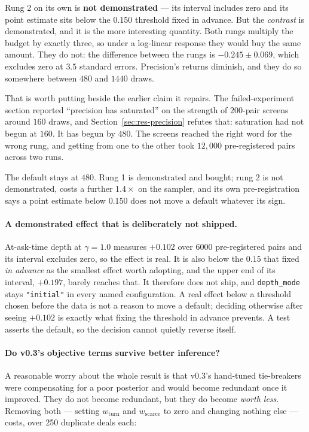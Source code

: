 \documentclass[11pt,a4paper]{article}
\begin{document}
Rung 2 on its own is \textbf{not demonstrated} --- its interval includes zero
and its point estimate sits below the $0.150$ threshold fixed in advance. But
the \emph{contrast} is demonstrated, and it is the more interesting quantity.
Both rungs multiply the budget by exactly three, so under a log-linear response
they would buy the same amount. They do not: the difference between the rungs
is $-0.245 \pm 0.069$, which excludes zero at $3.5$ standard errors.
Precision's returns diminish, and they do so somewhere between $480$ and $1440$
draws.

That is worth putting beside the earlier claim it repairs. The failed-experiment
section reported ``precision has saturated'' on the strength of $200$-pair
screens around $160$ draws, and Section~\ref{sec:res-precision} refutes that:
saturation had not begun at $160$. It has begun by $480$. The screens reached
the right word for the wrong rung, and getting from one to the other took
$12{,}000$ pre-registered pairs across two runs.

The default stays at $480$. Rung 1 is demonstrated and bought; rung 2 is not
demonstrated, costs a further $1.4\times$ on the sampler, and its own
pre-registration says a point estimate below $0.150$ does not move a default
whatever its sign.

\paragraph{A demonstrated effect that is deliberately not shipped.} At-ask-time
depth at $\gamma = 1.0$ measures $+0.102$ over $6000$ pre-registered pairs and
its interval excludes zero, so the effect is real. It is also below the $0.15$
that  fixed \emph{in advance} as the
smallest effect worth adopting, and the upper end of its interval, $+0.197$,
barely reaches that. It therefore does not ship, and \texttt{depth\_mode} stays
\texttt{"initial"} in every named configuration. A real effect below a threshold
chosen before the data is not a reason to move a default; deciding otherwise
after seeing $+0.102$ is exactly what fixing the threshold in advance prevents.
A test asserts the default, so the decision cannot quietly reverse itself.

\paragraph{Do v0.3's objective terms survive better inference?} A reasonable
worry about the whole result is that v0.3's hand-tuned tie-breakers were
compensating for a poor posterior and would become redundant once it improved.
They do not become redundant, but they do become \emph{worth less}. Removing
both --- setting $w_{\mathrm{turn}}$ and $w_{\mathrm{scarce}}$ to zero and
changing nothing else --- costs, over 250 duplicate deals each:
\end{document}
